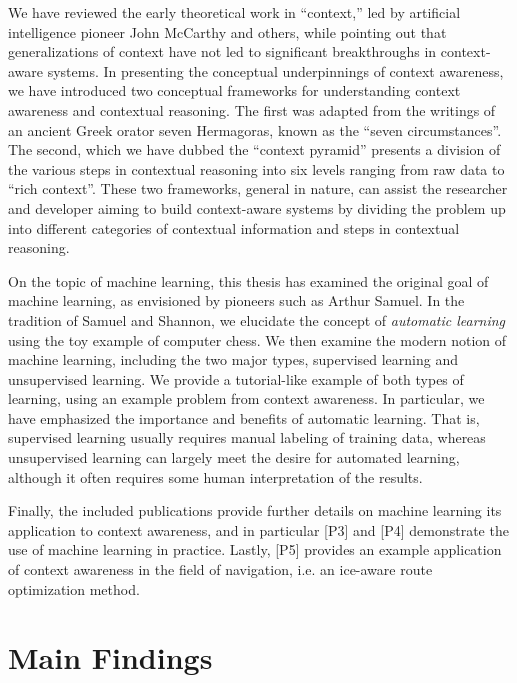 We have reviewed the early theoretical work in ``context,'' led by artificial intelligence pioneer John McCarthy and others, while pointing out that generalizations of context have not led to significant breakthroughs in context-aware systems. In presenting the conceptual underpinnings of context awareness, we have introduced two conceptual frameworks for understanding context awareness and contextual reasoning. The first was adapted from the writings of an ancient Greek orator seven Hermagoras, known as the ``seven circumstances''. The second, which we have dubbed the ``context pyramid'' presents a division of the various steps in contextual reasoning into six levels ranging from raw data to ``rich context''. These two frameworks, general in nature, can assist the researcher and developer aiming to build context-aware systems by dividing the problem up into different categories of contextual information and steps in contextual reasoning.

On the topic of machine learning, this thesis has examined the original goal of machine learning, as envisioned by pioneers such as Arthur Samuel. In the tradition of Samuel and Shannon, we elucidate the concept of \emph{automatic learning} using the toy example of computer chess. We then examine the modern notion of machine learning, including the two major types, supervised learning and unsupervised learning. We provide a tutorial-like example of both types of learning, using an example problem from context awareness. In particular, we have emphasized the importance and benefits of automatic learning. That is, supervised learning usually requires manual labeling of training data, whereas unsupervised learning can largely meet the desire for automated learning, although it often requires some human interpretation of the results. 

Finally, the included publications provide further details on machine learning its application to context awareness, and in particular [P3] and [P4] demonstrate the use of machine learning in practice. Lastly, [P5] provides an example application of context awareness in the field of navigation, i.e. an ice-aware route optimization method.

\section{Main Findings}
\label{sec:main_findings}

